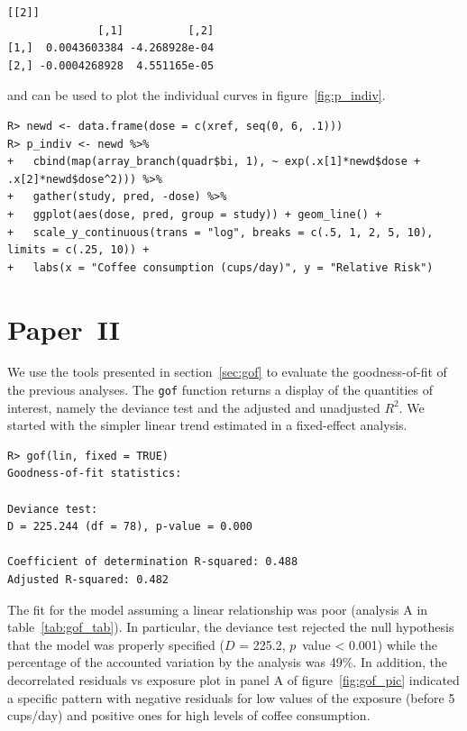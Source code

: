 \documentclass[11pt,a4paper,twoside,openany]{book}\usepackage{knitr}
\begin{document}
{\begin{knitrout}
\begin{kframe}
\begin{verbatim}
[[2]]
              [,1]          [,2]
[1,]  0.0043603384 -4.268928e-04
[2,] -0.0004268928  4.551165e-05
\end{verbatim}
\end{kframe}
\end{knitrout}

\noindent and can be used to plot the individual curves in figure~\ref{fig:p_indiv}.
\begin{knitrout}\footnotesize
{}\color{fgcolor}\begin{kframe}
\begin{verbatim}
R> newd <- data.frame(dose = c(xref, seq(0, 6, .1)))
R> p_indiv <- newd %>%
+   cbind(map(array_branch(quadr$bi, 1), ~ exp(.x[1]*newd$dose + .x[2]*newd$dose^2))) %>%
+   gather(study, pred, -dose) %>%
+   ggplot(aes(dose, pred, group = study)) + geom_line() +
+   scale_y_continuous(trans = "log", breaks = c(.5, 1, 2, 5, 10), limits = c(.25, 10)) +
+   labs(x = "Coffee consumption (cups/day)", y = "Relative Risk")
\end{verbatim}
\end{kframe}
\end{knitrout}


\section{Paper~II}\label{sec:res_paperII}



We use the tools presented in section~\ref{sec:gof} to evaluate the goodness-of-fit of the previous analyses. The \texttt{gof} function returns a display of the quantities of interest, namely the deviance test and the adjusted and unadjusted $R^2$. 
We started with the simpler linear trend estimated in a fixed-effect analysis.
\begin{knitrout}\footnotesize
{}\color{fgcolor}\begin{kframe}
\begin{verbatim}
R> gof(lin, fixed = TRUE)
Goodness-of-fit statistics:

Deviance test: 
D = 225.244 (df = 78), p-value = 0.000

Coefficient of determination R-squared: 0.488 
Adjusted R-squared: 0.482
\end{verbatim}
\end{kframe}
\end{knitrout}

\noindent The fit for the model assuming a linear relationship was poor (analysis A in table~\ref{tab:gof_tab}). In particular, the deviance test rejected the null hypothesis that the model was properly specified ($D$ = 225.2, $p$~value < 0.001) while the percentage of the accounted variation by the analysis was 49\%. In addition, the decorrelated residuals vs exposure plot in panel A of figure~\ref{fig:gof_pic} indicated a specific pattern with negative residuals for low values of the exposure (before 5 cups/day) and positive ones for high levels of coffee consumption.

}
\end{document}
